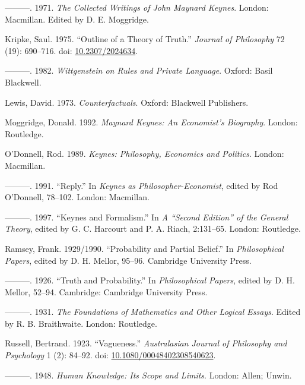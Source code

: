 \documentclass[
  10pt,
  letterpaper,
  DIV=11,
  numbers=noendperiod,
  twoside]{scrartcl}
\newlength{\cslhangindent}
\newenvironment{CSLReferences}[2] %
 {\begin{list}{}{%
  \setlength{\itemindent}{0pt}
  \setlength{\leftmargin}{0pt}
  \setlength{\parsep}{0pt}
  \ifodd #1
   \setlength{\leftmargin}{\cslhangindent}
   \setlength{\itemindent}{-1\cslhangindent}
  \fi
  \setlength{\itemsep}{#2\baselineskip}}}
 {\end{list}}
\begin{document}
\begin{CSLReferences}{1}{0}
---------. 1971. \emph{The Collected Writings of John Maynard Keynes}.
London: Macmillan. Edited by D. E. Moggridge.

Kripke, Saul. 1975. {``Outline of a Theory of Truth.''} \emph{Journal of
Philosophy} 72 (19): 690--716. doi:
\href{https://doi.org/10.2307/2024634}{10.2307/2024634}.

---------. 1982. \emph{Wittgenstein on Rules and Private Language}.
Oxford: Basil Blackwell.

Lewis, David. 1973. \emph{Counterfactuals}. Oxford: Blackwell
Publishers.

Moggridge, Donald. 1992. \emph{Maynard Keynes: An Economist's
Biography}. London: Routledge.

O'Donnell, Rod. 1989. \emph{Keynes: Philosophy, Economics and Politics}.
London: Macmillan.

---------. 1991. {``Reply.''} In \emph{Keynes as Philosopher-Economist},
edited by Rod O'Donnell, 78--102. London: Macmillan.

---------. 1997. {``Keynes and Formalism.''} In \emph{A {``Second
Edition''} of the General Theory}, edited by G. C. Harcourt and P. A.
Riach, 2:131--65. London: Routledge.

Ramsey, Frank. 1929/1990. {``Probability and Partial Belief.''} In
\emph{Philosophical Papers}, edited by D. H. Mellor, 95--96. Cambridge
University Press.

---------. 1926. {``Truth and Probability.''} In \emph{Philosophical
Papers}, edited by D. H. Mellor, 52--94. Cambridge: Cambridge University
Press.

---------. 1931. \emph{The Foundations of Mathematics and Other Logical
Essays}. Edited by R. B. Braithwaite. London: Routledge.

Russell, Bertrand. 1923. {``Vagueness.''} \emph{Australasian Journal of
Philosophy and Psychology} 1 (2): 84--92. doi:
\href{https://doi.org/10.1080/00048402308540623}{10.1080/00048402308540623}.

---------. 1948. \emph{Human Knowledge: Its Scope and Limits}. London:
Allen; Unwin.


\end{CSLReferences}
\end{document}
